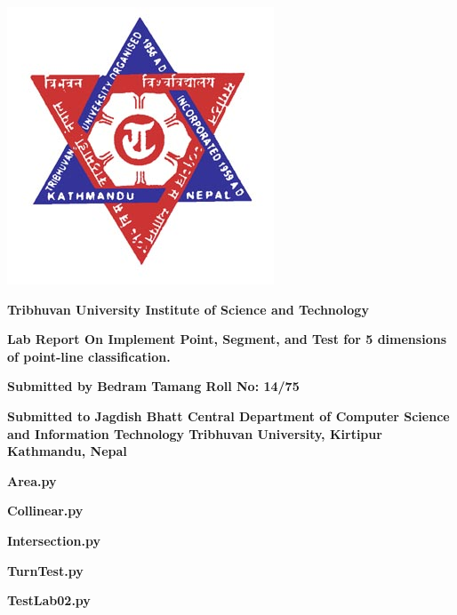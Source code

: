 \documentclass[12pt]{extreport}
\begin{document}
\begin{center}
\includegraphics[scale=0.5]{logo.jpg}
\end{center}

\begin{center}
\textbf{
Tribhuvan University
\linebreak
Institute of Science and Technology 
}
\end{center}


\begin{center}
\vspace{2cm}
\textbf{
Lab Report
\linebreak
On
\linebreak
Implement Point, Segment, and Test for 5 dimensions of point-line classification.  
}
\end{center}

\begin{center}
\vspace{3cm}
\textbf{
Submitted by
\linebreak
Bedram Tamang
\linebreak
Roll No: 14/75
}
\end{center}


\begin{center}
	\vspace{3cm}
	\textbf{
		Submitted to 
		\linebreak
		Jagdish Bhatt
		\linebreak
		Central Department of Computer Science and Information Technology
		\linebreak
		Tribhuvan University, Kirtipur
		Kathmandu, Nepal
	}
\end{center}



\clearpage

\begin{flushleft}
\textbf{Area.py}

\textbf{Collinear.py}

\textbf{Intersection.py}

\textbf{TurnTest.py}

\textbf{TestLab02.py}

\end{flushleft}
\end{document}
